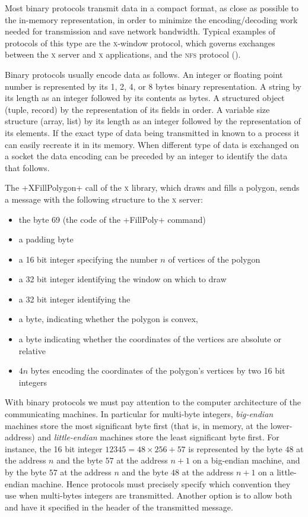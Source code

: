 Most binary protocols transmit data in a compact format, as close as
possible to the in-memory representation, in order to minimize the
encoding/decoding work needed for transmission and save network
bandwidth. Typical examples of protocols of this type are the
\textsc{x}-window protocol, which governs exchanges between the
\textsc{x} server and \textsc{x} applications, and the
\textsc{nfs} protocol ().

Binary protocols usually encode data as follows. An integer or
floating point number is represented by its 1, 2, 4, or 8 bytes binary
representation. A string by its length as an integer followed by its
contents as bytes. A structured object (tuple, record) by the
representation of its fields in order. A variable size structure
(array, list) by its length as an integer followed by the
representation of its elements. If the exact type of data being
transmitted in known to a process it can easily recreate it in its
memory. When different type of data is exchanged on a socket the data
encoding can be preceded by an integer to identify the data that
follows.


\begin{example}
The \ml+XFillPolygon+ call of the \textsc{x} library, which draws and
fills a polygon, sends a message with the following structure to the  
\textsc{x} server:
\begin{itemize}
\item the byte 69 (the code of the \ml+FillPoly+ command)
\item a padding byte
\item a 16 bit integer specifying the number $n$ of vertices of the polygon
\item a 32 bit integer identifying the window on which to draw
\item a 32 bit integer identifying the 
\item a  byte, indicating whether the polygon is convex, \etc
\item a byte indicating whether the coordinates of the vertices are absolute or
  relative
\item $4n$ bytes encoding the coordinates of the polygon's vertices
  by two 16 bit integers
\end{itemize}
\enlargethispage{1\onelineskip} %
\end{example}
\pagebreak

With binary protocols we must pay attention to the computer
architecture of the communicating machines. In particular for
multi-byte integers, \emph{big-endian} machines store the most
significant byte first (that is, in memory, at the lower-address) and
\emph{little-endian} machines store the least significant byte
first. For instance, the 16 bit integer $12345 = 48 \times 256 + 57$
is represented by the byte $48$ at the address $n$ and the byte $57$
at the address $n+1$ on a big-endian machine, and by the byte
$57$ at the address $n$ and the byte $48$ at the address $n+1$ on a
little-endian machine. Hence protocols must precisely specify which
convention they use when multi-bytes integers are transmitted. Another
option is to allow both and have it specified in the header of the
transmitted message. 

